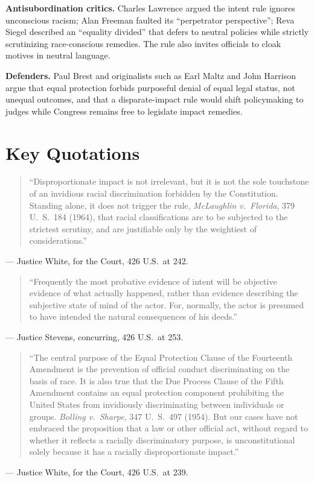 \documentclass[12pt]{article}
\begin{document}
\textbf{Antisubordination critics.} Charles Lawrence argued the intent rule ignores unconscious racism; Alan Freeman faulted its ``perpetrator perspective''; Reva Siegel described an ``equality divided'' that defers to neutral policies while strictly scrutinizing race-conscious remedies. The rule also invites officials to cloak motives in neutral language.

\textbf{Defenders.} Paul Brest and originalists such as Earl Maltz and John Harrison argue that equal protection forbids purposeful denial of equal legal status, not unequal outcomes, and that a disparate-impact rule would shift policymaking to judges while Congress remains free to legislate impact remedies.

\section{Key Quotations}

\begin{quote}
``Disproportionate impact is not irrelevant, but it is not the sole touchstone of an invidious racial discrimination forbidden by the Constitution. Standing alone, it does not trigger the rule, \textit{McLaughlin v.\ Florida}, 379 U.\ S.\ 184 (1964), that racial classifications are to be subjected to the strictest scrutiny, and are justifiable only by the weightiest of considerations.''
\end{quote}
\noindent --- Justice White, for the Court, 426 U.S.\ at 242.

\begin{quote}
``Frequently the most probative evidence of intent will be objective evidence of what actually happened, rather than evidence describing the subjective state of mind of the actor. For, normally, the actor is presumed to have intended the natural consequences of his deeds.''
\end{quote}
\noindent --- Justice Stevens, concurring, 426 U.S.\ at 253.

\begin{quote}
``The central purpose of the Equal Protection Clause of the Fourteenth Amendment is the prevention of official conduct discriminating on the basis of race. It is also true that the Due Process Clause of the Fifth Amendment contains an equal protection component prohibiting the United States from invidiously discriminating between individuals or groups. \textit{Bolling v.\ Sharpe}, 347 U.\ S.\ 497 (1954). But our cases have not embraced the proposition that a law or other official act, without regard to whether it reflects a racially discriminatory purpose, is unconstitutional solely because it has a racially disproportionate impact.''
\end{quote}
\noindent --- Justice White, for the Court, 426 U.S.\ at 239.
\end{document}

